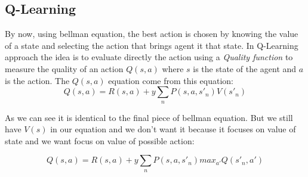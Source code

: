 \subsection{Q-Learning}
By now, using bellman equation, the best action is chosen by knowing the value of a state and selecting the action that brings agent it that state. In Q-Learning approach the idea is to evaluate directly the action using a \textit{Quality function} to measure the quality of an action $Q(s, a)$ where $s$ is the state of the agent  and $a$ is the action.
The $Q(s,a)$ equation come from this equation:
\begin{equation}
Q(s,a) = R(s,a) + y \sum_{n} P(s,a,s'_n)V(s'_n)
\end{equation}

As we can see it is identical to the final piece of bellman equation. But we still have $V(s)$ in our equation and we don't want it because it focuses on value of state and we want focus on value of possible action:

\begin{equation}
Q(s,a) = R(s,a) + y \sum_{n} P(s,a,s'_n) max_{a'}Q(s'_n, a')
\end{equation}